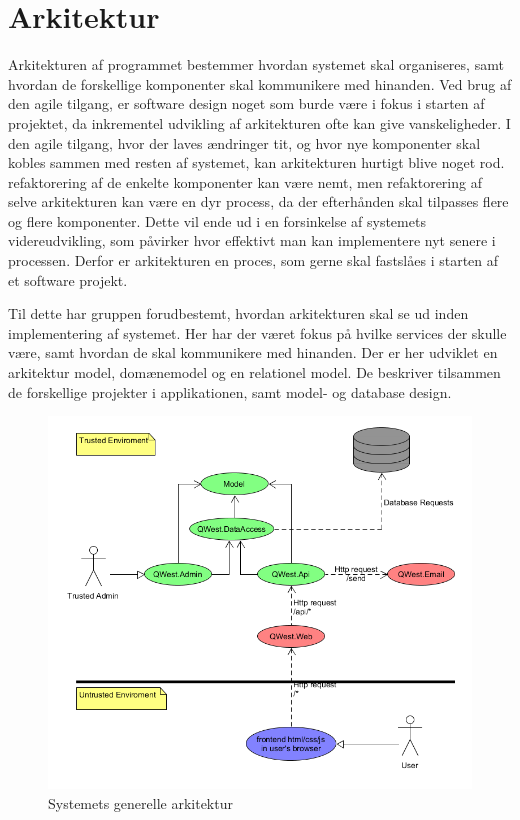 \chapter{Arkitektur}\label{ch:Arkitektur}

Arkitekturen af programmet bestemmer hvordan systemet skal organiseres, samt hvordan de forskellige komponenter skal kommunikere med hinanden. Ved brug af den agile tilgang, er software design noget som burde være i fokus i starten af projektet, da inkrementel udvikling af arkitekturen ofte kan give vanskeligheder. I den agile tilgang, hvor der laves ændringer tit, og hvor nye komponenter skal kobles sammen med resten af systemet, kan arkitekturen hurtigt blive noget rod. refaktorering af de enkelte komponenter kan være nemt, men refaktorering af selve arkitekturen kan være en dyr process, da der efterhånden skal tilpasses flere og flere komponenter. Dette vil ende ud i en forsinkelse af systemets videreudvikling, som påvirker hvor effektivt man kan implementere nyt senere i processen. Derfor er arkitekturen en proces, som gerne skal fastslåes i starten af et software projekt. \cite{Sommerville}

Til dette har gruppen forudbestemt, hvordan arkitekturen skal se ud inden implementering af systemet. Her har der været fokus på hvilke services der skulle være, samt hvordan de skal kommunikere med hinanden. Der er her udviklet en arkitektur model, domænemodel og en relationel model. De beskriver tilsammen de forskellige projekter i applikationen, samt model- og database design. 

\begin{figure}
    \includegraphics[width=\linewidth]{figures/Architecture.png}
    \caption{Systemets generelle arkitektur}
    \label{fig:Architecture}
\end{figure}

